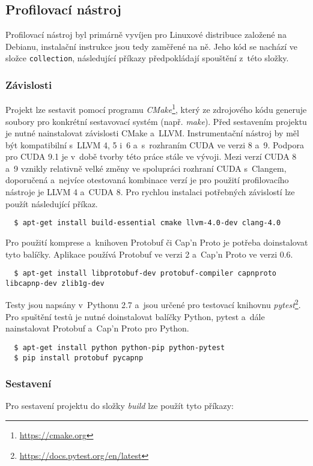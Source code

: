 \subsection{Profilovací nástroj}
Profilovací nástroj byl primárně vyvíjen pro Linuxové distribuce založené na Debianu, instalační instrukce jsou tedy zaměřené na ně. Jeho kód se nachází ve složce \texttt{collection}, následující příkazy předpokládají spouštění z~této složky. 

\subsubsection{Závislosti}
Projekt lze sestavit pomocí programu \emph{CMake}\footnote{\url{https://cmake.org}}, který ze zdrojového kódu generuje soubory pro konkrétní sestavovací systém (např. \emph{make}). Před sestavením projektu je nutné nainstalovat závislosti CMake a~LLVM. Instrumentační nástroj by měl být kompatibilní s~LLVM 4, 5 i~6 a~s~rozhraním CUDA ve verzi 8 a~9. Podpora pro CUDA 9.1 je v~době tvorby této práce stále ve vývoji.
Mezi verzí CUDA 8 a~9 vznikly relativně velké změny ve spolupráci rozhraní CUDA s~Clangem, doporučená a~nejvíce otestovaná kombinace verzí je pro použití profilovacího nástroje je LLVM 4 a~CUDA 8. Pro rychlou instalaci potřebných závislostí lze použít následující příkaz.
\begin{verbatim}
  $ apt-get install build-essential cmake llvm-4.0-dev clang-4.0
\end{verbatim}
Pro použití komprese a~knihoven Protobuf či Cap'n Proto je potřeba doinstalovat tyto balíčky. Aplikace používá Protobuf ve verzi 2 a~Cap'n Proto ve verzi 0.6.
\begin{verbatim}
  $ apt-get install libprotobuf-dev protobuf-compiler capnproto libcapnp-dev zlib1g-dev
\end{verbatim}
Testy jsou napsány v~Pythonu 2.7 a~jsou určené pro testovací knihovnu \emph{pytest}\footnote{\url{https://docs.pytest.org/en/latest}}. Pro spuštění testů je nutné doinstalovat balíčky Python, pytest a~dále nainstalovat Protobuf a~Cap'n Proto pro Python.
\begin{verbatim}
  $ apt-get install python python-pip python-pytest
  $ pip install protobuf pycapnp
\end{verbatim}

\subsubsection{Sestavení}
Pro sestavení projektu do složky \emph{build} lze použít tyto příkazy:
\vspace{1mm}

